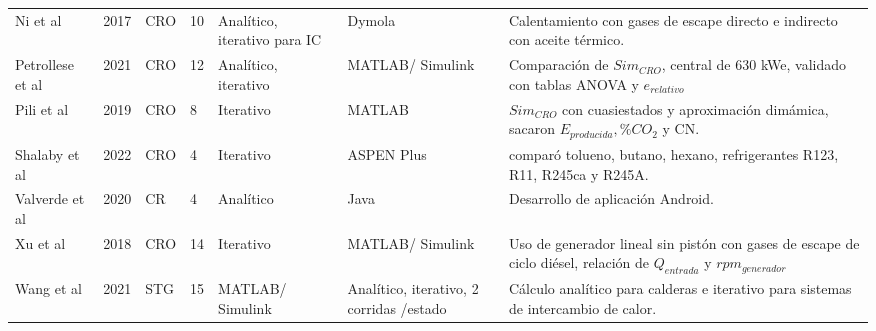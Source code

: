 {\begin{footnotesize}
\begin{longtable}[H]{p{1.5cm}p{0.5cm}p{1.6cm}p{0.4cm}p{1.7cm}p{1.6cm}p{6.5cm}}
    Ni et al & 2017 & CRO & 10 & Analítico, iterativo para IC & Dymola & Calentamiento con gases de escape directo e indirecto con aceite térmico.\\
    Petrollese et al & 2021 & CRO & 12 & Analítico, iterativo & MATLAB/ Simulink & Comparación de $Sim_{CRO}$, central de 630 kWe, validado con tablas ANOVA y $e_{relativo}$ \\
    Pili et al & 2019 & CRO & 8 & Iterativo & MATLAB & $Sim_{CRO}$ con cuasiestados y aproximación dimámica, sacaron $E_{producida}, \% CO_{2}$ y CN. \\
    Shalaby et al & 2022 & CRO & 4 & Iterativo & ASPEN Plus & comparó tolueno, butano, hexano, refrigerantes R123, R11, R245ca y R245A. \\
    Valverde et al & 2020 & CR & 4 & Analítico & Java & Desarrollo de aplicación Android. \\
    Xu et al & 2018 & CRO & 14 & Iterativo & MATLAB/ Simulink & Uso de generador lineal sin pistón con gases de escape de ciclo diésel, relación de $Q_{entrada}$ y $rpm_{generador}$ \\
    Wang et al & 2021 & STG & 15 & MATLAB/ Simulink & Analítico, iterativo, 2 corridas /estado & Cálculo analítico para calderas e iterativo para sistemas de intercambio de calor. \\
    \hline
\end{longtable}


\end{footnotesize}}
